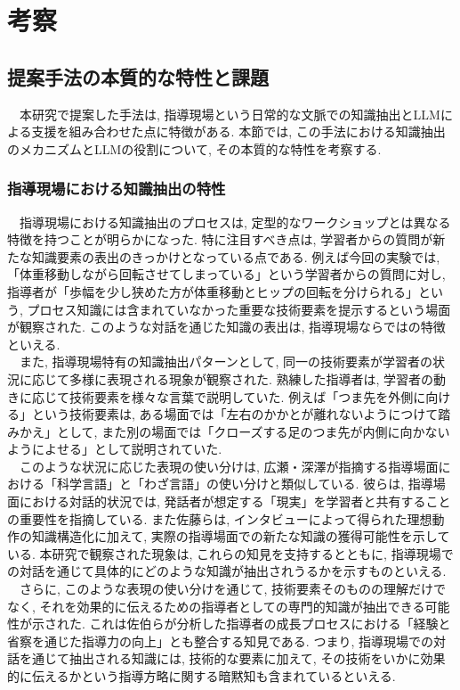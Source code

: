 \chapter{考察}
\section{提案手法の本質的な特性と課題}
　本研究で提案した手法は, 指導現場という日常的な文脈での知識抽出とLLMによる支援を組み合わせた点に特徴がある. 本節では, この手法における知識抽出のメカニズムとLLMの役割について, その本質的な特性を考察する.

\subsection{指導現場における知識抽出の特性}
　指導現場における知識抽出のプロセスは, 定型的なワークショップとは異なる特徴を持つことが明らかになった. 特に注目すべき点は, 学習者からの質問が新たな知識要素の表出のきっかけとなっている点である. 例えば今回の実験では, 「体重移動しながら回転させてしまっている」という学習者からの質問に対し, 指導者が「歩幅を少し狭めた方が体重移動とヒップの回転を分けられる」という, プロセス知識には含まれていなかった重要な技術要素を提示するという場面が観察された. このような対話を通じた知識の表出は, 指導現場ならではの特徴といえる.\\
　また, 指導現場特有の知識抽出パターンとして, 同一の技術要素が学習者の状況に応じて多様に表現される現象が観察された. 熟練した指導者は, 学習者の動きに応じて技術要素を様々な言葉で説明していた. 例えば「つま先を外側に向ける」という技術要素は, ある場面では「左右のかかとが離れないようにつけて踏みかえ」として, また別の場面では「クローズする足のつま先が内側に向かないようによせる」として説明されていた. \\
　このような状況に応じた表現の使い分けは, 広瀬・深澤\cite{Hirose2018}が指摘する指導場面における「科学言語」と「わざ言語」の使い分けと類似している. 彼らは, 指導場面における対話的状況では, 発話者が想定する「現実」を学習者と共有することの重要性を指摘している. また佐藤ら\cite{Sato2024}は, インタビューによって得られた理想動作の知識構造化に加えて, 実際の指導場面での新たな知識の獲得可能性を示している. 本研究で観察された現象は, これらの知見を支持するとともに, 指導現場での対話を通じて具体的にどのような知識が抽出されうるかを示すものといえる.\\
　さらに, このような表現の使い分けを通じて, 技術要素そのものの理解だけでなく, それを効果的に伝えるための指導者としての専門的知識が抽出できる可能性が示された. これは佐伯ら\cite{Saeki2017}が分析した指導者の成長プロセスにおける「経験と省察を通じた指導力の向上」とも整合する知見である. つまり, 指導現場での対話を通じて抽出される知識には, 技術的な要素に加えて, その技術をいかに効果的に伝えるかという指導方略に関する暗黙知も含まれているといえる.\\
